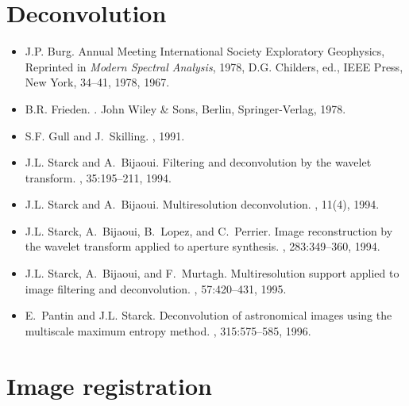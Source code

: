 \section{Deconvolution}

\begin{itemize}
\item  J.P. Burg.
\newblock Annual Meeting International Society Exploratory Geophysics,
  Reprinted in {\em Modern Spectral Analysis}, 
1978, D.G. Childers, ed., IEEE Press,
  New York, 34--41, 1978, 1967.

\item B.R. Frieden.
.
\newblock John Wiley \& Sons, Berlin, Springer-Verlag, 1978.

\item S.F. Gull and J.~Skilling.
, 1991.

\item J.L. Starck and A.~Bijaoui.
\newblock Filtering and deconvolution by the wavelet transform.
, 35:195--211, 1994.

\item J.L. Starck and A.~Bijaoui.
\newblock Multiresolution deconvolution.
, 11(4), 1994.
  
\item J.L. Starck, A.~Bijaoui, B.~Lopez, and C.~Perrier.
\newblock Image reconstruction by the wavelet transform applied to aperture
  synthesis.
, 283:349--360, 1994.

\item J.L. Starck, A.~Bijaoui, and F.~Murtagh.
\newblock Multiresolution support applied to image filtering and deconvolution.
, 57:420--431,
  1995.

\item E.~Pantin and J.L. Starck.
\newblock Deconvolution of astronomical images using the multiscale maximum
  entropy method.
, 315:575--585, 1996.

\end{itemize}


\section{Image registration}

